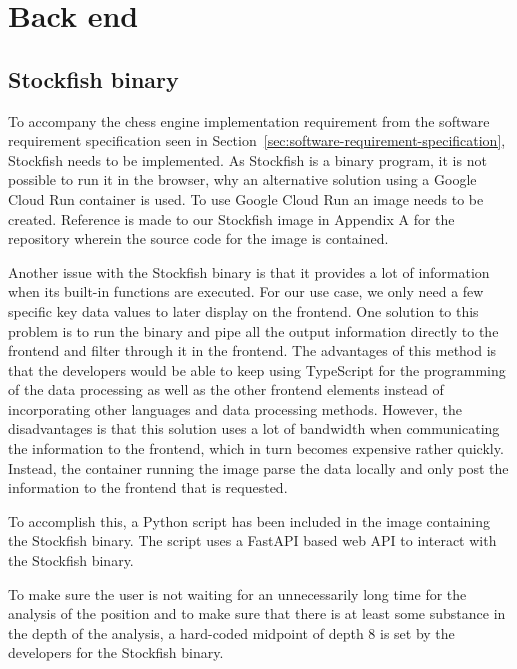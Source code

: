 \section{Back end}\label{sec:back-end}

\subsection{Stockfish binary}\label{subsec:stockfish-binary}

To accompany the chess engine implementation requirement from the software requirement specification seen in
Section~\ref{sec:software-requirement-specification}, Stockfish needs to be implemented.
As Stockfish is a binary program, it is not possible to run it in the browser, why an alternative solution using a
Google Cloud Run container is used.
To use Google Cloud Run an image needs to be created.
Reference is made to our Stockfish image in Appendix A for the repository wherein the source code for the image is
contained.

Another issue with the Stockfish binary is that it provides a lot of information when its built-in functions are
executed.
For our use case, we only need a few specific key data values to later display on the frontend.
One solution to this problem is to run the binary and pipe all the output information directly to the frontend and
filter through it in the frontend.
The advantages of this method is that the developers would be able to keep using TypeScript for the programming of the
data processing as well as the other frontend elements instead of incorporating other languages and data processing
methods.
However, the disadvantages is that this solution uses a lot of bandwidth when communicating the information to the
frontend, which in turn becomes expensive rather quickly.
Instead, the container running the image parse the data locally and only post the information to the frontend that is
requested.

To accomplish this, a Python script has been included in the image containing the Stockfish binary.
The script uses a FastAPI based web API to interact with the Stockfish binary.

To make sure the user is not waiting for an unnecessarily long time for the analysis of the position and to make sure
that there is at least some substance in the depth of the analysis, a hard-coded midpoint of depth 8 is set by the
developers for the Stockfish binary.

